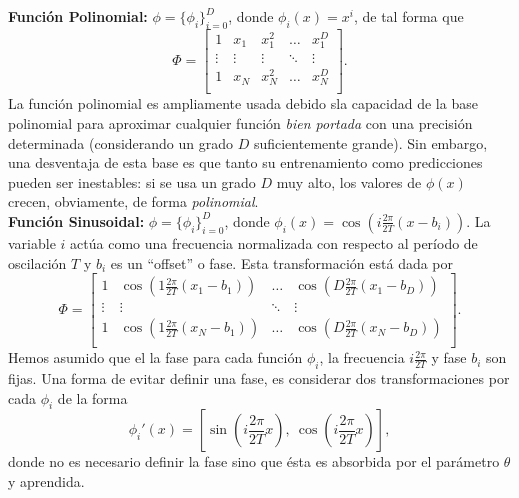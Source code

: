 \noindent\textbf{Función Polinomial:} $\phi=\{\phi_i\}_{i=0}^D$, donde $\phi_i(x)=x^i$, de tal forma que 
\begin{equation}
    \Phi = \left[ \begin{matrix} 1 & x_1 & x_1^2 & \ldots & x_1^D\\
    \vdots & \vdots & \vdots & \ddots & \vdots \\
    1 & x_N & x_N^2 & \ldots & x_N^D\\
    \end{matrix} \right].
\end{equation}
La función polinomial es ampliamente usada debido sla capacidad de la base polinomial para aproximar cualquier función \emph{bien portada} con una precisión determinada (considerando un grado  $D$ suficientemente  grande). Sin embargo, una desventaja de esta  base es que tanto su entrenamiento como  predicciones pueden ser inestables: si se usa un grado $D$ muy alto,  los valores de $\phi(x)$ crecen, obviamente, de forma \emph{polinomial}.\\

\noindent\textbf{Función Sinusoidal:} $\phi=\{\phi_i\}_{i=0}^D$, donde $\phi_i(x)=\cos\left(i\frac{2\pi}{2T}(x - b_i)\right)$. La variable $i$ actúa como una frecuencia normalizada con respecto al período de oscilación $T$ y $b_i$ es un ``offset''  o fase. Esta transformación está dada por
\begin{equation}
    \Phi = \left[ \begin{matrix}
    1 & \cos\left(1\frac{2\pi}{2T}(x_1-b_1)\right) & \ldots & \cos\left(D\frac{2\pi}{2T}(x_1-b_D)\right)\\
    \vdots & \vdots  & \ddots & \vdots \\
    1 & \cos\left(1\frac{2\pi}{2T}(x_N-b_1)\right) & \ldots & \cos\left(D\frac{2\pi}{2T}(x_N-b_D)\right)\\
    \end{matrix} \right].
\end{equation}
Hemos asumido que el la fase para cada función $\phi_i$, la frecuencia $i\frac{2\pi}{2T}$ y fase $b_i$ son fijas. Una forma de evitar definir una fase, es considerar dos transformaciones por cada $\phi_i$ de la forma
\begin{equation}
    \phi_i'(x) = \left[\sin\left(i\frac{2\pi}{2T}x\right),\ \cos\left(i\frac{2\pi}{2T}x\right)\right],
\end{equation}
donde no es necesario definir la fase sino que ésta es absorbida por el parámetro $\theta$ y aprendida.  

